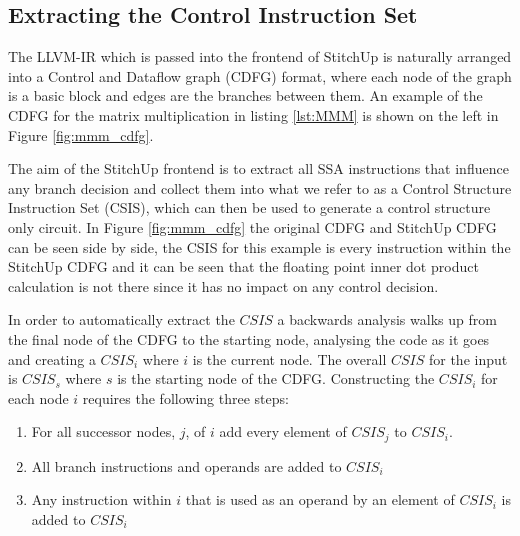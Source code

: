 \subsection{Extracting the Control Instruction Set}
The LLVM-IR which is passed into the frontend of StitchUp is naturally arranged into a Control and Dataflow graph (CDFG) format,
where each node of the graph is a basic block and edges are the branches between them.
An example of the CDFG for the matrix multiplication in listing \ref{lst:MMM} is shown on the left in Figure \ref{fig:mmm_cdfg}.

The aim of the StitchUp frontend is to extract all SSA instructions that influence any branch decision and collect them into what
we refer to as a Control Structure Instruction Set (CSIS), which can then be used to generate a control structure only circuit.
In Figure \ref{fig:mmm_cdfg} the original CDFG and StitchUp CDFG can be seen side by side, the CSIS for this example
is every instruction within the StitchUp CDFG and it can be seen that the floating point inner dot product calculation
is not there since it has no impact on any control decision.

In order to automatically extract the $CSIS$ a backwards analysis walks up from the final node of the CDFG to the starting node, analysing
the code as it goes and creating a $CSIS_{i}$ where $i$ is the current node.
The overall $CSIS$ for the input is $CSIS_s$ where $s$ is the starting node of the CDFG.
Constructing the $CSIS_i$ for each node $i$ requires the following three steps:
\begin{enumerate}
    \item For all successor nodes, $j$, of $i$ add every element of $CSIS_j$ to $CSIS_i$.
    \item All branch instructions and operands are added to $CSIS_i$
    \item Any instruction within $i$ that is used as an operand by an element of $CSIS_i$ is added to $CSIS_i$
\end{enumerate}

